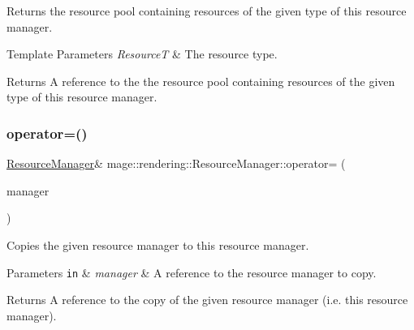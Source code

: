 Returns the resource pool containing resources of the given type of this resource manager.


\begin{DoxyTemplParams}{Template Parameters}
{\em ResourceT} & The resource type. \\
\hline
\end{DoxyTemplParams}
\begin{DoxyReturn}{Returns}
A reference to the the resource pool containing resources of the given type of this resource manager. 
\end{DoxyReturn}
\mbox{\label{classmage_1_1rendering_1_1_resource_manager_a188467ab4e46176ee5184c9f5e5ac64f}} 
\subsubsection{\texorpdfstring{operator=()}{operator=()}\hspace{0.1cm}{\footnotesize\ttfamily [1/2]}}
{\footnotesize\ttfamily \mbox{\hyperlink{classmage_1_1rendering_1_1_resource_manager}{Resource\+Manager}}\& mage\+::rendering\+::\+Resource\+Manager\+::operator= (\begin{DoxyParamCaption}\item[{const \mbox{\hyperlink{classmage_1_1rendering_1_1_resource_manager}{Resource\+Manager}} \&}]{manager }\end{DoxyParamCaption})\hspace{0.3cm}{\ttfamily [delete]}}

Copies the given resource manager to this resource manager.


\begin{DoxyParams}[1]{Parameters}
\mbox{\tt in}  & {\em manager} & A reference to the resource manager to copy. \\
\hline
\end{DoxyParams}
\begin{DoxyReturn}{Returns}
A reference to the copy of the given resource manager (i.\+e. this resource manager). 
\end{DoxyReturn}
\mbox{\label{classmage_1_1rendering_1_1_resource_manager_a1e3f511409bcde3a7a3296364a0298f5}} 
